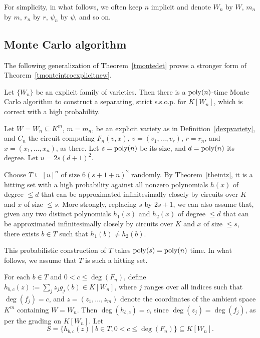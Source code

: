 \documentclass[11pt]{article}
\begin{document}
For simplicity, in what follows, 
we often keep $n$ implicit and  denote $W_n$ by $W$, $m_n$ by $m$, $r_n$ by $r$,
$\psi_n$ by $\psi$, and so on.

\subsection{Monte Carlo algorithm}  \label{smontecarloexp}
The following generalization of Theorem~\ref{tmontedet}
proves a stronger form of Theorem~\ref{tmonteintroexplicitnew}.

\begin{theorem} \label{tmonteexplicit}
Let $\{W_n\}$ be an explicit family of varieties. Then
there  is a ${\mbox {poly}}(n)$-time Monte Carlo algorithm to construct a separating, strict  s.s.o.p. for $K[W_n]$, which is correct with
a high probability.
\end{theorem}
\proof 
Let  $W=W_n \subseteq K^m$, $m=m_n$,  be an explicit variety as in Definition~\ref{dexpvariety}, 
and $C_n$  the circuit computing $F_n(v,x)$, $v=(v_1,\ldots,v_r)$, $r=r_n$,  and $x=(x_1,\ldots,x_n)$,  as there. 
Let $s={\mbox {poly}}(n)$ be its size, and $d={\mbox {poly}}(n)$ its degree. Let $u= 2 s (d+1)^2$.

Choose  $T \subseteq [u]^n$ of size $6 (s+1 + n)^2$ randomly. By Theorem~\ref{theintz}, it is 
a hitting set  with a high probability against  all nonzero polynomials  $h(x)$ of degree $\le d$ that can be 
approximated infinitesimally closely  by  circuits over $K$ and $x$ of size $\le s$. 
More strongly, replacing $s$ by $2 s +1$, we can also assume  that, given
any two distinct polynomials $h_1(x)$ and $h_2(x)$ of degree $\le d$ that 
can be 
approximated infinitesimally closely  by  circuits over $K$ and $x$ of size $\le s$, 
there exists $b \in T$ such that $h_1(b) \not =  h_2(b)$.

This probabilistic construction of $T$  takes ${\mbox {poly}}(s)={\mbox {poly}}(n)$ time.
In what follows, we assume that $T$ is such a hitting set.

For each $b \in T$ and $0< c \le \deg(F_n)$, define
$h_{b,c}(z):=\sum_j z_j g_j(b) \in K[W_n]$, 
where $j$ ranges over all indices such that $\deg(f_j)=c$, and $z=(z_1,\ldots,z_m)$ denote the coordinates of the ambient
space $K^m$ containing $W=W_n$.
Then $\deg(h_{b,c})=c$, since $\deg(z_j)=\deg(f_j)$, as per the grading on $K[W_n]$. Let 
\begin{equation} \label{eqS}
 S=\{ h_{b,c}(z) \ | \ b \in T, 0< c \le \deg(F_n)\} \subseteq K[W_n].
\end{equation}
\end{document}
